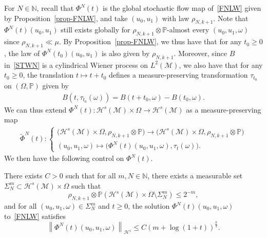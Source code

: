 \documentclass[10pt]{amsart}
\theoremstyle{definition}\newtheorem{defi}[theo]{Definition}\newtheorem{rema}[theo]{Remark}\newtheorem{exam}[theo]{Example}\newtheorem{exem}[theo]{Example}\newtheorem{nota}[theo]{Notation}
\newcommand{\Prob}{\mathbb{P}}
\newcommand{\N}{\mathbb{N}}
\newcommand{\M}{\mathcal{M}}
\renewcommand{\H}{\mathcal{H}}
\newcommand{\Si}{\Sigma}
\newcommand{\wt}{\widetilde}
\renewcommand{\o}{\omega}
\renewcommand{\O}{\Omega}
\begin{document}
For $N\in\N$, recall that $\Phi^N(t)$ is the global stochastic flow map of~\eqref{FNLW} given by Proposition~\ref{prop-FNLW}, and take $(u_0,u_1)$ with law $\rho_{N,k+1}$. Note that $\Phi^N(t)(u_0,u_1)$ still exists globally for $\rho_{N,k+1}\otimes\Prob$-almost every $(u_0,u_1,\o)$ since $\rho_{N,k+1}\ll\mu$. By Proposition~\ref{prop-FNLW}, we thus have that for any $t_0\ge 0$, the law of $\Phi^N(t_0)(u_0,u_1)$ is also given by $\rho_{N,k+1}$. Moreover, since $B$ in~\eqref{STWN} is a cylindrical Wiener process on $L^2(\M)$, we also have that for any $t_0\ge 0$, the translation $t\mapsto t+t_0$ defines a measure-preserving transformation $\tau_{t_0}$ on $(\O,\Prob)$ given by
\begin{align}\label{Markov}
B(t,\tau_{t_0}(\o))= B(t+t_0,\o)-B(t_0,\o).
\end{align}
We can thus extend $\Phi^N(t):\H^s(\M)\times \O\to \H^s(\M)$ as a measure-preserving map
\begin{align*}
\wt\Phi^N(t):
\begin{cases}
\big(\H^s(\M)\times \O,\rho_{N,k+1}\otimes\Prob\big) \to \big(\H^s(\M)\times \O,\rho_{N,k+1}\otimes\Prob\big)\\
(u_0,u_1,\o)\mapsto \big(\Phi^N(t)(u_0,u_1,\o),\tau_t(\o)\big).
\end{cases}
\end{align*}
We then have the following control on $\Phi^N(t)$.

\begin{prop}\label{prop-Si}
There exists $C>0$ such that for all $m,N\in\N$, there exists a measurable set $\Si_N^{m}\subset \H^s(\M)\times\O$ such that
\begin{equation}\label{measure-Si}
\rho_{N,k+1}\otimes\Prob\left(\H^s(\M)\times\O\setminus\Si_N^{m}\right)\leq 2^{-m},
\end{equation}
and for all $(u_0,u_1,\o)\in\Si_N^{m}$ and $t\ge 0$, the solution $\Phi^N(t)(u_0,u_1,\o)$ to~\eqref{FNLW} satisfies
\begin{equation}\label{estim-Si}
\left\|\Phi^N(t)(u_0,u_1,\o)\right\|_{\H^{s}} \leq C\left(m+\log(1+t)\right)^{\frac{k}2}.
\end{equation}
\end{prop}
\end{document}
